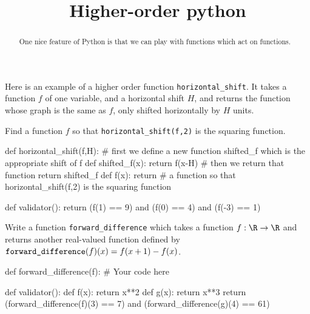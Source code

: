 \documentclass{ximera}
\title{Higher-order python}
\begin{document}
\begin{abstract}
  One nice feature of Python is that we can play with functions which act on functions.
\end{abstract}

\begin{question}
  Here is an example of a higher order function
  \verb|horizontal_shift|.  It takes a function $f$ of one variable,
  and a horizontal shift $H$, and returns the function whose graph is
  the same as $f$, only shifted horizontally by $H$ units.


  \begin{solution}
    Find a function $f$ so that \verb|horizontal_shift(f,2)| is the squaring function.
  
    \begin{python}
def horizontal_shift(f,H):
  # first we define a new function shifted_f which is the appropriate shift of f
  def shifted_f(x):  
    return f(x-H)
  # then we return that function
  return shifted_f
def f(x):
  return # a function so that horizontal_shift(f,2) is the squaring function

def validator():
  return (f(1) == 9) and (f(0) == 4) and (f(-3) == 1)
    \end{python}
  \end{solution}


  \begin{solution}
    Write a function \verb|forward_difference| which takes a function $f : \R \to \R$ and returns another real-valued function defined 
    by $\verb|forward_difference|(f)(x) = f(x+1)-f(x)$.

    \begin{python}
def forward_difference(f):
  # Your code here

def validator():
  def f(x):
    return x**2
  def g(x):
    return x**3
  return (forward_difference(f)(3) == 7) and (forward_difference(g)(4) == 61)
    \end{python}
  \end{solution}
\end{question}
\end{document}
